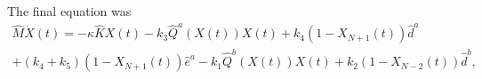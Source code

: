 \documentclass[11pt, a4paper]{article}\usepackage[]{graphicx}\usepackage[]{color}
\begin{document}
The final equation was 
\begin{align*}
\hat{M}\dot{X}(t) = -\kappa\hat{K}X(t) - k_3\hat{Q}^a(X(t))X(t)  + k_4(1-X_{N+1}(t))\hat{d}^a \\
+ (k_4 + k_5)(1-X_{N+1}(t))\hat{e}^a - k_1\hat{Q}^b(X(t))X(t) + k_2(1-X_{N-2}(t))\hat{d}^b,\\
\end{align*}
\end{document}
